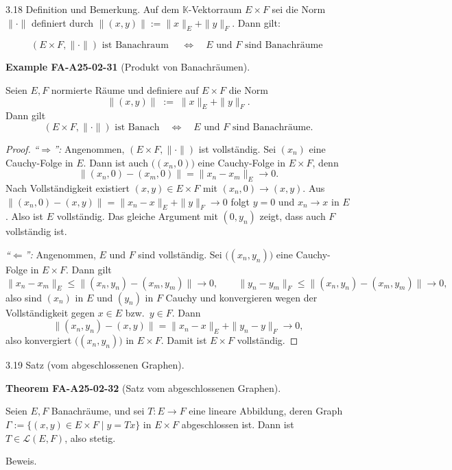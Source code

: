 \documentclass[10pt, letterpaper]{article}
\newcommand{\CustomHeading}[3]{%
  \par\medskip\noindent%
  \textbf{#1 #2} \textnormal{(#3)}.\enskip%
}
\newenvironment{THEO}[2]{\begin{unitbox}\CustomHeading{Theorem}{#1}{#2}}{\end{unitbox}}
\newenvironment{EXA}[2]{\begin{unitbox}\CustomHeading{Example}{#1}{#2}}{\end{unitbox}}
\begin{document}
3.18 Definition und Bemerkung. Auf dem $\mathbb{K}$-Vektorraum $E \times F$ sei die Norm $\|\cdot\|$ definiert durch $\|(x, y)\|:=\|x\|_{E}+\|y\|_{F}$. Dann gilt:

$$
(E \times F,\|\cdot\|) \text { ist Banachraum } \quad \Longleftrightarrow \quad E \text { und } F \text { sind Banachräume }
$$


\begin{EXA}{FA-A25-02-31}{Produkt von Banachräumen}
Seien $E,F$ normierte Räume und definiere auf $E\times F$ die Norm
\[
\|(x,y)\|\;:=\;\|x\|_E+\|y\|_F.
\]
Dann gilt
\[
(E\times F,\|\cdot\|)\text{ ist Banach} \quad\Longleftrightarrow\quad
E\text{ und }F\text{ sind Banachräume.}
\]


\begin{proof}
\emph{``$\Rightarrow$'':} Angenommen, $(E\times F,\|\cdot\|)$ ist vollständig.
Sei $(x_n)$ eine Cauchy-Folge in $E$. Dann ist auch $\bigl((x_n,0)\bigr)$ eine
Cauchy-Folge in $E\times F$, denn
\[
\|(x_n,0)-(x_m,0)\|=\|x_n-x_m\|_E\to 0.
\]
Nach Vollständigkeit existiert $(x, y)\in E\times F$ mit $(x_n,0)\to (x,y)$.
Aus $\|(x_n,0)-(x,y)\|=\|x_n-x\|_E+\|y\|_F\to 0$ folgt $y=0$ und $x_n\to x$ in $E$.
Also ist $E$ vollständig. Das gleiche Argument mit $(0,y_n)$ zeigt, dass auch $F$
vollständig ist.

\medskip
\emph{``$\Leftarrow$'':} Angenommen, $E$ und $F$ sind vollständig.
Sei $\bigl((x_n,y_n)\bigr)$ eine Cauchy-Folge in $E\times F$. Dann gilt
\[
\|x_n-x_m\|_E \le \|(x_n,y_n)-(x_m,y_m)\|\to 0,\qquad
\|y_n-y_m\|_F \le \|(x_n,y_n)-(x_m,y_m)\|\to 0,
\]
also sind $(x_n)$ in $E$ und $(y_n)$ in $F$ Cauchy und konvergieren wegen der
Vollständigkeit gegen $x\in E$ bzw.\ $y\in F$. Dann
\[
\|(x_n,y_n)-(x,y)\|=\|x_n-x\|_E+\|y_n-y\|_F\to 0,
\]
also konvergiert $\bigl((x_n,y_n)\bigr)$ in $E\times F$. Damit ist $E\times F$
vollständig.
\end{proof}
\end{EXA}



3.19 Satz (vom abgeschlossenen Graphen). 


\begin{THEO}{FA-A25-02-32}{Satz vom abgeschlossenen Graphen}
Seien $E, F$ Banachräume, und sei $T: E \rightarrow F$ eine lineare Abbildung, deren Graph $\Gamma:=\{(x, y) \in E \times F \mid y=T x\}$ in $E \times F$ abgeschlossen ist. Dann ist $T \in \mathcal{L}(E, F)$, also stetig.
\end{THEO}

Beweis. 
\end{document}
